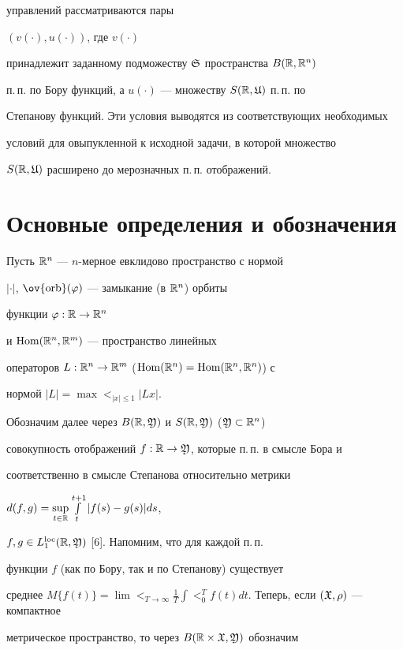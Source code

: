 управлений рассматриваются пары


$(v(\cdot),u(\cdot))$, где $v(\cdot)$


принадлежит заданному подможеству $\frak S$ пространства $B(\Bbb R,\Bbb R^{n})$


п.\,п. по Бору функций, а $u(\cdot)$ --- множеству $S(\Bbb R,\frak U)$ п.\,п. по


Степанову функций. Эти условия выводятся из соответствующих необходимых


условий для овыпукленной к исходной задачи, в которой множество


$S(\Bbb R,\frak U)$ расширено до мерозначных п.\,п. отображений.





\section{Основные определения и обозначения}





Пусть $\Bbb R^{n}$ --- $n$-мерное евклидово пространство с нормой


$|\cdot|$, $\ov{\orb}(\varphi)$ --- замыкание (в $\Bbb R^{n}$) орбиты


функции $\varphi:\Bbb R\to\Bbb R^{n}$


и $\operatorname{Hom}(\Bbb R^{n},\Bbb R^{m})$ --- пространство линейных


операторов $L:\Bbb R^{n}\to\Bbb R^{m}$ ($\operatorname{Hom}(\Bbb R^{n})=\operatorname{Hom}(\Bbb R^{n},\Bbb R^{n})$) с


нормой $|L|=\max\lt_{|x|\le1}|Lx|$.


Обозначим далее через $B(\Bbb R,\frak Y)$ и $S(\Bbb R,\frak Y)$ ($\frak Y\subset\Bbb R^{n}$)


совокупность отображений $f:\Bbb R\to \frak Y$, которые п.\,п. в смысле Бора и


соответственно в смысле Степанова относительно метрики


$d(f,g)=\sup\limits_{t\in\Bbb R}\int\limits_{t}^{t+1}|f(s)-g(s)|ds$,


$f, g\in L_{1}^{\operatorname{loc}}(\Bbb R,\frak Y)$ [6]. Напомним, что для каждой п.\,п.


функции $f$ (как по Бору, так и по Степанову) существует


среднее $M\{f(t)\}= \lim\lt_{T\to \infty}\frac{1}{T}\int\lt_0^T


f(t)dt$. Теперь, если $(\gX,\rho)$ --- компактное


метрическое пространство, то через $B(\Bbb R\times\frak X,\frak Y)$ обозначим


